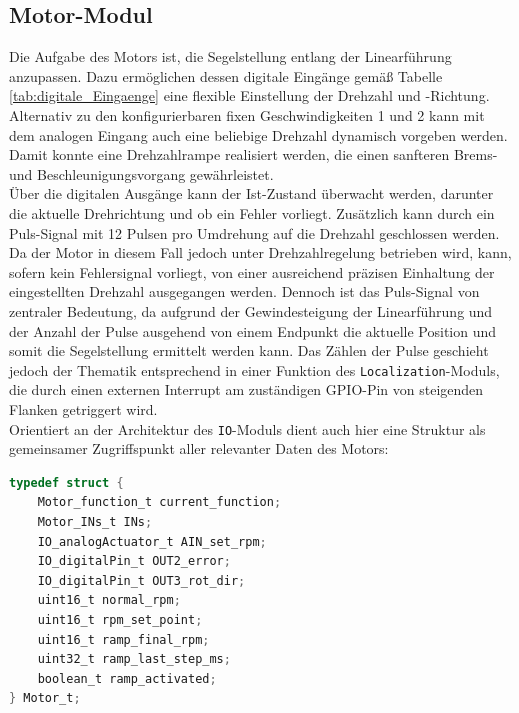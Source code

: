 \subsection{Motor-Modul}
Die Aufgabe des Motors ist, die Segelstellung entlang der Linearführung anzupassen. Dazu ermöglichen dessen digitale Eingänge gemäß Tabelle \ref{tab:digitale_Eingaenge} eine flexible Einstellung der Drehzahl und -Richtung. Alternativ zu den konfigurierbaren fixen Geschwindigkeiten 1 und 2 kann mit dem analogen Eingang auch eine beliebige Drehzahl dynamisch vorgeben werden. Damit konnte eine Drehzahlrampe realisiert werden, die einen sanfteren Brems- und Beschleunigungsvorgang gewährleistet.\\

\noindent
Über die digitalen Ausgänge kann der Ist-Zustand überwacht werden, darunter die aktuelle Drehrichtung und ob ein Fehler vorliegt. Zusätzlich kann durch ein Puls-Signal mit 12 Pulsen pro Umdrehung auf die Drehzahl geschlossen werden. Da der Motor in diesem Fall jedoch unter Drehzahlregelung betrieben wird, kann, sofern kein Fehlersignal vorliegt, von einer ausreichend präzisen Einhaltung der eingestellten Drehzahl ausgegangen werden. Dennoch ist das Puls-Signal von zentraler Bedeutung, da aufgrund der Gewindesteigung der Linearführung und der Anzahl der Pulse ausgehend von einem Endpunkt die aktuelle Position und somit die Segelstellung ermittelt werden kann. Das Zählen der Pulse geschieht jedoch der Thematik entsprechend in einer Funktion des \verb|Localization|-Moduls, die durch einen externen Interrupt am zuständigen GPIO-Pin von steigenden Flanken getriggert wird.\\

\noindent
Orientiert an der Architektur des \verb|IO|-Moduls dient auch hier eine Struktur als gemeinsamer Zugriffspunkt aller relevanter Daten des Motors:
\begin{lstlisting}[language=C, caption={Struktur des Motors}, label={lst:motor}]
typedef struct {
	Motor_function_t current_function;
	Motor_INs_t INs;
	IO_analogActuator_t AIN_set_rpm;
	IO_digitalPin_t OUT2_error;
	IO_digitalPin_t OUT3_rot_dir;
	uint16_t normal_rpm;
	uint16_t rpm_set_point;
	uint16_t ramp_final_rpm;
	uint32_t ramp_last_step_ms;
	boolean_t ramp_activated;
} Motor_t;
\end{lstlisting}
